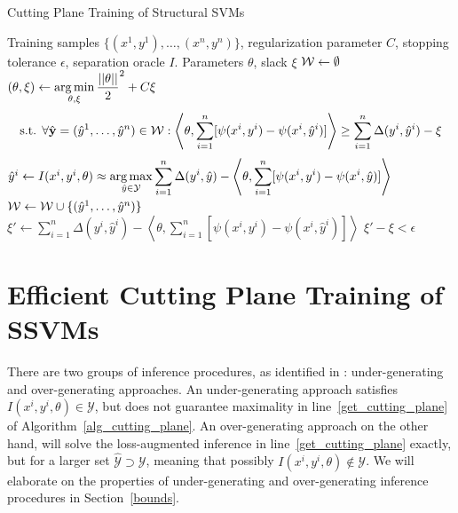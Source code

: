 \begin{algorithm*}[t]
    \caption{Cutting Plane Training of Structural SVMs \label{alg_cutting_plane}}

\begin{algorithmic}[1]
    \Require Training samples $\{ (x^{1}, y^{1}), \dots, (x^{n}, y^{n})\}$, regularization parameter $C$, stopping tolerance $\epsilon$, separation oracle $I$.
    \Ensure Parameters $\theta$, slack $\xi$
    \State $\mathcal{W} \leftarrow \emptyset$
    \Repeat
    \State $(\theta, \xi) \leftarrow \displaystyle \operatorname*{arg\,min}_{\theta, \xi} \frac{||\theta||}{2}^2 + C \xi$\label{restricted}\\
    \begin{equation*}
        \text{s.t. }\forall \hat{\mathbf{y}}=(\hat{y}^1, \dots, \hat{y}^n) \in \mathcal{W}:
        \left \langle \theta, \sum_{i=1}^n [\psi(x^i, y^i) - \psi(x^i,
            \hat{y}^i)] \right \rangle \geq \sum_{i=1}^n \Delta(y^i, \hat{y}^i)
            - \xi
    \end{equation*}
    \State
    $\hat{y}^i \leftarrow I(x^i, y^i, \theta) \approx \displaystyle \operatorname*{arg\,max}_{\hat{y}\in\mathcal{Y}} \sum_{i=1}^n \Delta(y^i, \hat{y}) - \left \langle \theta, \sum_{i=1}^n [\psi(x^i, y^i) - \psi(x^i, \hat{y})] \right \rangle$ \label{get_cutting_plane}
    \EndFor
    \State $\mathcal{W} \leftarrow \mathcal{W} \cup \{ (\hat{y}^1, \dots, \hat{y}^n) \} $
    \State $ \displaystyle \xi' \leftarrow  \sum_{i=1}^n \Delta(y^i, \hat{y}^i) - \left \langle \theta, \sum_{i=1}^n [\psi(x^i, y^i) - \psi(x^i, \hat{y}^i)] \right \rangle$
    \Until $\xi' - \xi < \epsilon$ \label{convergence_check}
\end{algorithmic}
\end{algorithm*}

\section{Efficient Cutting Plane Training of SSVMs}\label{learning}

There are two groups of inference procedures, as identified in
\citet{finley2008training}: under-generating and over-generating approaches.
An under-generating approach satisfies $I(x^i, y^i, \theta) \in
\mathcal{Y}$, but does not guarantee maximality in line~\ref{get_cutting_plane}
of Algorithm~\ref{alg_cutting_plane}. An over-generating approach on the other
hand, will solve the loss-augmented inference in line~\ref{get_cutting_plane}
exactly, but for a larger set $\hat{\mathcal{Y}} \supset \mathcal{Y}$, meaning
that possibly $I(x^i, y^i, \theta) \notin \mathcal{Y}$.  We will elaborate on
the properties of under-generating and over-generating inference procedures in
Section~\ref{bounds}.


